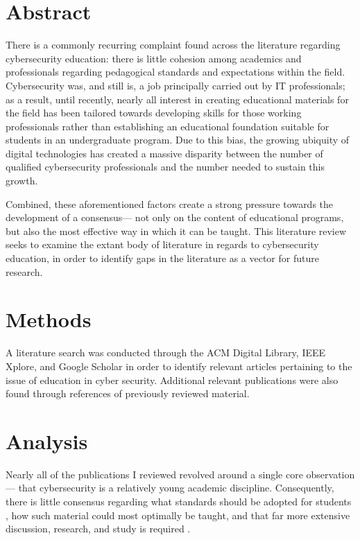 \section{Abstract}


    There is a commonly recurring complaint found across the literature regarding cybersecurity education: there is little cohesion among academics and professionals regarding pedagogical standards and expectations within the field. %
Cybersecurity was, and still is, a job principally carried out by IT professionals; %
as a result, until recently, nearly all interest in creating educational materials for the field has been tailored towards developing skills for those working professionals rather than establishing an educational foundation suitable for students in an undergraduate program. %
Due to this bias, the growing ubiquity of digital technologies has created a massive disparity between the number of qualified cybersecurity professionals and the number needed to sustain this growth. 
    
    Combined, these aforementioned factors create a strong pressure towards the development of a consensus---%
not only on the content of educational programs, but also the most effective way in which it can be taught. %
This literature review seeks to examine the extant body of literature in regards to cybersecurity education, in order to identify gaps in the literature as a vector for future research.

\section{Methods}

    A literature search was conducted through the ACM Digital Library, IEEE Xplore, and Google Scholar in order to identify relevant articles pertaining to the issue of education in cyber security. %
Additional relevant publications were also found through references of previously reviewed material.

\section{Analysis}

    Nearly all of the publications I reviewed revolved around a single core observation---%
that cybersecurity is a relatively young academic discipline. %
Consequently, there is little consensus regarding what standards should be adopted for students \cite{R-Raj}, how such material could most optimally be taught, and that far more extensive discussion, research, and study is required \cite{Z-Zeng}. 
    
